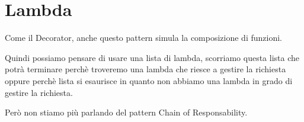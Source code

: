 \section{Lambda}

Come il Decorator, anche questo pattern simula la composizione di funzioni.

Quindi possiamo pensare di usare una lista di lambda, scorriamo questa lista che potrà terminare perchè troveremo una lambda che riesce a gestire la richiesta oppure 
perchè lista si esaurisce in quanto non abbiamo una lambda in grado di gestire la richiesta.

Però non stiamo più parlando del pattern Chain of Responsability.
